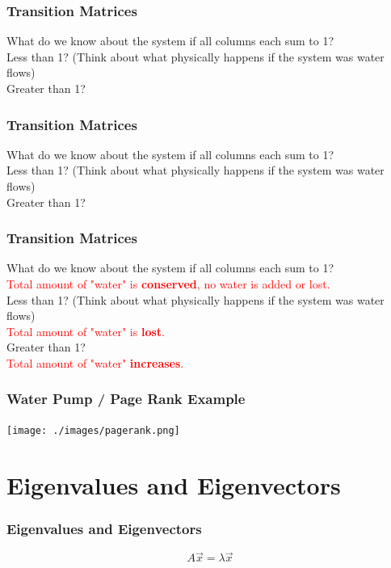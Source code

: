 \documentclass{beamer}
\begin{document}
\begin{frame}
\frametitle{Transition Matrices}
What do we know about the system if all columns each sum to 1?  \\
\vspace{20pt}
Less than 1? (Think about what physically happens if the system was water flows) \\
\vspace{20pt}
Greater than 1?
\end{frame}


\begin{frame}
\frametitle{Transition Matrices}
What do we know about the system if all columns each sum to 1?  \\
\vspace{20pt}
Less than 1? (Think about what physically happens if the system was water flows) \\
\vspace{20pt}
Greater than 1?
\end{frame}

\begin{frame}
\frametitle{Transition Matrices}
What do we know about the system if all columns each sum to 1?  \\
\vspace{20pt}
\textcolor{red}{Total amount of "water" is \textbf{conserved}, no water is added or lost.} \\
\vspace{20pt}
Less than 1? (Think about what physically happens if the system was water flows) \\
\vspace{20pt}
\textcolor{red}{Total amount of "water" is \textbf{lost}.}\\
\vspace{20pt}
Greater than 1? \\
\vspace{20pt}
\textcolor{red}{Total amount of "water" \textbf{increases}.}
\end{frame}

\begin{frame}
\frametitle{Water Pump / Page Rank Example}
\texttt{[image: ./images/pagerank.png]}
\end{frame}

\section*{Eigenvalues and Eigenvectors}


\begin{frame}
\frametitle{Eigenvalues and Eigenvectors}
\huge $$A \vec{x} = \lambda \vec{x}$$
\end{frame}
\end{document}
